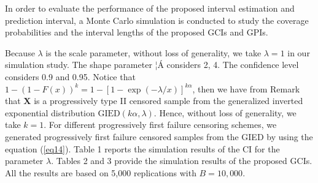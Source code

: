 \documentclass[12pt]{article}
\begin{document}
In order to evaluate the performance of the proposed interval estimation and prediction interval, a Monte Carlo simulation is conducted to %
study the coverage probabilities and the interval lengths of the proposed GCIs and GPIs.

Because $\lambda$ is the scale parameter, without loss of generality, we take $\lambda=1$ in our simulation study. The shape parameter $¦Á$ considers 2, 4. The confidence level considers 0.9 and 0.95. Notice that $1-(1-F(x))^k=1-[1-\exp(-\lambda/x)]^{k\alpha}$, then we have from Remark that $\textbf{X}$ is a progressively type II censored sample from the generalized inverted exponential distribution $\mbox{GIED}(k \alpha, \lambda)$. Hence, without loss of generality, we take $k=1$. For different progressively first failure censoring schemes, we generated progressively first failure censored samples from the GIED by using the equation (\ref{eq14}). %
Table 1 reports the simulation results of the CI for the parameter $\lambda$. Tables 2 and 3 provide the simulation results of the proposed GCIs. All the results are based on 5,000 replications with $B=10,000$.
\end{document}
